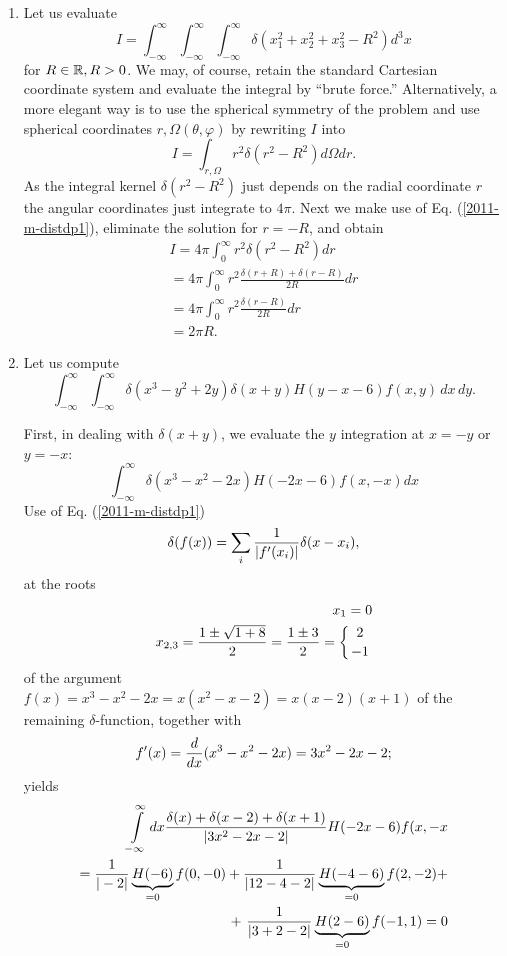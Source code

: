 {\begin{enumerate}
\item
Let us evaluate
\begin{equation}
I=
\int_{-\infty}^\infty
\int_{-\infty}^\infty
\int_{-\infty}^\infty
\delta (x_1^2+x_2^2+x_3^2-R^2) d^3x
\end{equation}
for  $R \in {\Bbb R}, R >0 $.
We may, of course, retain the standard Cartesian coordinate system and evaluate the integral by ``brute force.''
Alternatively,
a more elegant way is to use the spherical symmetry of the problem and use spherical coordinates $r, \Omega (\theta ,\varphi )$ by rewriting $I$
into
\begin{equation}
I=  \int_{r,\Omega} r^2  \delta (r^2-R^2) d\Omega dr.
\end{equation}
As the integral kernel $\delta (r^2-R^2)$ just depends on the radial coordinate $r$
the angular coordinates just integrate to $4\pi$.
Next we make use of Eq. (\ref{2011-m-distdp1}), eliminate the solution for $r=-R$, and obtain
\begin{equation}
\begin{split}
I= 4\pi   \int_0^\infty r^2  \delta (r^2-R^2)  dr \\
 =  4\pi   \int_0^\infty  r^2 \frac{\delta (r+R) + \delta (r-R)}{2R}  dr \\
  =   4\pi   \int_0^\infty  r^2 \frac{\delta (r-R)}{2R}  dr \\
  =   2 \pi R.
\end{split}
\end{equation}

\item
Let us compute
\begin{equation}
\int_{-\infty}^\infty \int_{-\infty}^\infty  \delta
 (x^3-y^2+2y)\delta (x+y)H (y-x-6)f(x,y) \,dx\,dy.
\end{equation}

First, in dealing with
$\delta(x+y)$, we evaluate the $y$ integration at $x=-y$ or $y=-x$:
$$
   \int_{-\infty}^\infty \delta(x^3-x^2-2x)H(-2x-6)f(x,-x)  dx
$$
Use of Eq. (\ref{2011-m-distdp1})
$$
   \delta(f(x))=\sum_{i}{1\over|f'(x_i)|}\delta(x-x_i),
$$
at the roots
\begin{equation}
\begin{split}
   x_1=0\\
   x_{2,3}={1\pm\sqrt{1+8}\over 2}={1\pm3\over2}=\left\{{2\atop-1}\right.
\end{split}
\end{equation}
of the argument $f(x)=x^3-x^2-2x=x(x^2-x-2)=x(x-2)(x+1)$ of the remaining $\delta$-function,
together with
$$
 f'(x)=  {d\over dx}(x^3-x^2-2x)=3x^2-2x-2 ;
$$
yields
\begin{equation}
\begin{split}
   \int\limits_{-\infty}^\infty dx
         {\delta(x)+\delta(x-2)+\delta(x+1)\over|3x^2-2x-2|}
         H(-2x-6)f(x,-x \\
   ={1\over|-2|}\underbrace{H(-6)}_{ =0 }f(0,-0)+
      {1\over|12-4-2|}\underbrace{H(-4-6)}_{ =0 }f(2,-2)  +\\
   +\ {1\over|3+2-2|}\underbrace{H(2-6)}_{ =0 }f(-1,1)
=0
\end{split}
\end{equation}



\end{enumerate}}
